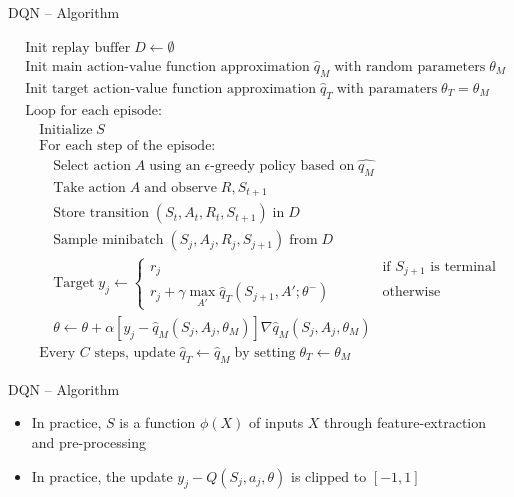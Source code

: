 \documentclass[ignorenonframetext,xcolor=x11names]{beamer}
\begin{document}
\begin{frame}{DQN -- Algorithm}
\footnotesize
\begin{block}{}
\vspace{-\baselineskip}
\begin{align*}
& \text{Init replay buffer}\;D \leftarrow \emptyset \\
& \text{Init main action-value function approximation}\;\hat{q}_M\;\text{with random parameters}\;\theta_M \\
& \text{Init target action-value function approximation}\;\hat{q}_T\;\text{with paramaters}\;\theta_T=\theta_M \\
& \text{Loop for each episode:}\\
& \quad \text{Initialize}\;S \\
& \quad \text{For each step of the episode:} \\
& \quad \quad \text{Select action}\; A \; \text{using an} \; \text{$\epsilon$-greedy policy based on}\; \hat{q_M}\\
& \quad \quad \text{Take action} \; A \; \text{and observe}\;R, S_{t+1} \\
& \quad \quad \text{Store transition} \; (S_t , A_t , R_t , S_{t+1} ) \; \text{in} \; D \\
& \quad \quad \text{Sample minibatch} \; (S_j , A_j , R_j , S_{j+1} ) \; \text{from} \; D \\
& \quad \quad \text{Target}\;y_j \leftarrow \begin{cases} r_j & \qquad \quad \text{if $S_{j+1}$ is terminal} \\
r_j + \gamma \max_{A'} \hat{q}_T(S_{j+1}, A'; \theta^-) & \qquad \quad \text{otherwise}\end{cases} \\
& \quad \quad \theta \leftarrow \theta + \alpha [y_j - \hat{q}_M (S_j, A_j, \theta_M)] \nabla \hat{q}_M(S_j, A_j, \theta_M) \hspace{1in} \\
& \quad \text{Every $C$ steps, update}\; \hat{q}_T \leftarrow \hat{q}_M\;\text{by setting}\; \theta_T \leftarrow \theta_M
\end{align*}
\vspace{-\baselineskip}
\end{block}
\end{frame}

\begin{frame}{DQN -- Algorithm}
\begin{itemize}
   \item In practice, $S$ is a function $\phi(X)$ of inputs $X$ through feature-extraction and pre-processing
   \item In practice, the update $y_j - Q(S_j, a_j, \theta)$ is clipped to $[-1, 1]$
   \end{itemize}
\end{frame}
\end{document}

